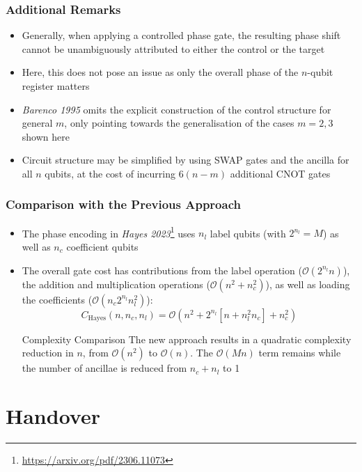 \documentclass{beamer}
\begin{document}
\begin{frame}
\frametitle{Additional Remarks}
\begin{itemize}
\item Generally, when applying a controlled phase gate, the resulting phase shift cannot be unambiguously attributed to either the control or the target 
\item Here, this \alert{does not pose an issue} as only the overall phase of the $n$-qubit register matters 
\item \emph{Barenco 1995} \alert{omits the explicit construction} of the control structure for general $m$, only pointing towards the generalisation of the cases $m=2,3$ shown here 
\item Circuit structure may be \alert{simplified by using SWAP gates} and the ancilla for all $n$ qubits, at the cost of incurring $6(n-m)$ additional CNOT gates    
\end{itemize}
\end{frame}

\begin{frame}
\frametitle{Comparison with the Previous Approach}
\begin{itemize}
\item The phase encoding in \emph{Hayes 2023}\footnote{\url{https://arxiv.org/pdf/2306.11073}} uses $n_l$ \alert{label qubits} (with $2^{n_l} =M$) as well as $n_c$ \alert{coefficient qubits} 
\item The overall gate cost has contributions from the label operation ($\mathcal{O}(2^{n_l}n)$), the addition and multiplication operations ($\mathcal{O}(n^2 + n_c^2)$), as well as loading the coefficients ($\mathcal{O}(n_c 2^{n_l} n_l^2)$):
\begin{equation}
C_\text{Hayes}(n, n_c, n_l) = \mathcal{O}(n^2 + 2^{n_l} [n + n_l^2 n_c] + n_c^2)
\end{equation}
\begin{alertblock}{Complexity Comparison}
The new approach results in a \alert{quadratic complexity reduction} in $n$, from $\mathcal{O}(n^2)$ to $\mathcal{O}(n)$. The $\mathcal{O}(Mn)$ term remains while the number of ancillae is reduced from $n_c + n_l$ to 1 
\end{alertblock}
\end{itemize}

\end{frame}


\section{Handover}
\end{document}
